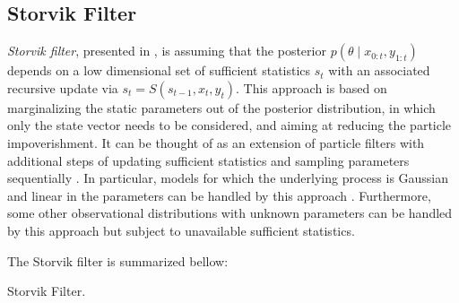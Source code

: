 \subsection{Storvik Filter}


\textit{Storvik filter}, presented in \cite{storvik2002particle}, is assuming that the posterior $p(\theta\mid x_{0:t},y_{1:t})$ depends on a low dimensional set of sufficient statistics $s_t$ with an associated recursive update via $s_t=S(s_{t-1},x_t,y_t)$. This approach is based on marginalizing the static parameters out of the posterior distribution, in which only the state vector needs to be considered, and aiming at reducing the particle impoverishment. It can be thought of as an extension of particle filters with additional steps of updating sufficient statistics and sampling parameters sequentially \cite{lopes2011particle}. In particular, models for which the underlying process is Gaussian and linear in the parameters can be handled by this approach \cite{storvik2002particle}. Furthermore, some other observational distributions with unknown parameters can be handled by this approach but subject to unavailable sufficient statistics. 

The Storvik filter is summarized bellow:
\begin{algorithm}[h]
\SetAlgoLined 
\caption{Storvik Filter.}\label{algorithmStFilter}
\end{algorithm}


